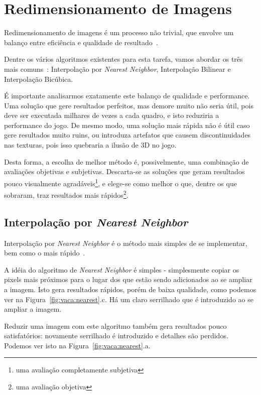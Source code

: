 \documentclass[12pt]{article}
\begin{document}
\section{Redimensionamento de Imagens}\label{sec:redimensionamento}

Redimensionamento de imagens é um processo não trivial, que envolve um balanço entre eficiência e qualidade de resultado~\cite{kopf:2011}.

Dentre os vários algoritmos existentes para esta tarefa, vamos abordar os três mais comuns~\cite{han2013}: Interpolação por \textit{Nearest Neighbor}, Interpolação Bilinear e Interpolação Bicúbica.

É importante analisarmos exatamente este balanço de qualidade e performance. Uma solução que gere resultados perfeitos, mas demore muito não seria útil, pois deve ser executada milhares de vezes a cada quadro, e isto reduziria a performance do jogo. De mesmo modo, uma solução mais rápida não é útil caso gere resultados muito ruins, ou introduza artefatos que causem discontinuidades nas texturas, pois isso quebraria a ilusão de 3D no jogo.

Desta forma, a escolha de melhor método é, possivelmente, uma combinação de avaliações objetivas e subjetivas. Descarta-se as soluções que geram resultados pouco visualmente agradáveis\footnote{uma avaliação completamente subjetiva}, e elege-se como melhor o que, dentre os que sobraram, traz resultados mais rápidos\footnote{uma avaliação objetiva}.

\subsection{Interpolação por \textit{Nearest Neighbor}}\label{sec:redimensionamento:nearest}
Interpolação por \textit{Nearest Neighbor} é o método mais simples de se implementar, bem como o mais rápido~\cite{han2013}.

A idéia do algoritmo de \textit{Nearest Neighbor} é simples - simplesmente copiar os pixels mais próximos para o lugar dos que estão sendo adicionados ao se ampliar a imagem. Isto gera resultados rápidos, porém de baixa qualidade, como podemos ver na Figura~\ref{fig:vaca:nearest}.c. Há um claro serrilhado que é introduzido ao se ampliar a imagem.

Reduzir uma imagem com este algoritmo também gera resultados pouco satisfatórios: novamente serrilhado é introduzido e detalhes são perdidos. Podemos ver isto na Figura~\ref{fig:vaca:nearest}.a.
\end{document}
